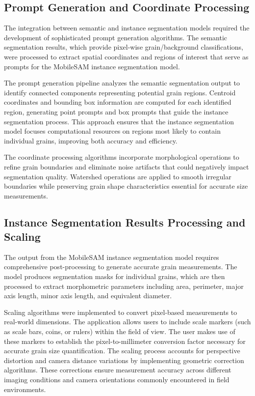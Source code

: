 \documentclass[final-report]{report-template}
\begin{document}
\subsection{Prompt Generation and Coordinate Processing}
The integration between semantic and instance segmentation models required the development of sophisticated prompt generation algorithms. The semantic segmentation results, which provide pixel-wise grain/background classifications, were processed to extract spatial coordinates and regions of interest that serve as prompts for the MobileSAM instance segmentation model.

The prompt generation pipeline analyzes the semantic segmentation output to identify connected components representing potential grain regions. Centroid coordinates and bounding box information are computed for each identified region, generating point prompts and box prompts that guide the instance segmentation process. This approach ensures that the instance segmentation model focuses computational resources on regions most likely to contain individual grains, improving both accuracy and efficiency.

The coordinate processing algorithms incorporate morphological operations to refine grain boundaries and eliminate noise artifacts that could negatively impact segmentation quality. Watershed operations are applied to smooth irregular boundaries while preserving grain shape characteristics essential for accurate size measurements.

\subsection{Instance Segmentation Results Processing and Scaling}
The output from the MobileSAM instance segmentation model requires comprehensive post-processing to generate accurate grain measurements. The model produces segmentation masks for individual grains, which are then processed to extract morphometric parameters including area, perimeter, major axis length, minor axis length, and equivalent diameter.

Scaling algorithms were implemented to convert pixel-based measurements to real-world dimensions. The application allows users to include scale markers (such as scale bars, coins, or rulers) within the field of view. The user makes use of these markers to establish the pixel-to-millimeter conversion factor necessary for accurate grain size quantification.
The scaling process accounts for perspective distortion and camera distance variations by implementing geometric correction algorithms. These corrections ensure measurement accuracy across different imaging conditions and camera orientations commonly encountered in field environments.
\end{document}
